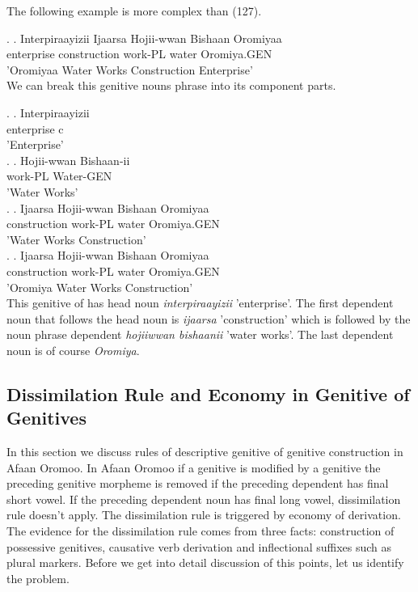 \documentclass[11pt,a4paper]{article}
\begin{document}
	The following example is more complex than (127).
	
	 \ex.
	 \ag.
	 Interpiraayizii Ijaarsa Hojii-wwan Bishaan Oromiyaa\\
	 enterprise construction work-PL water Oromiya.GEN\\
	 'Oromiyaa Water Works Construction Enterprise'\\
	
	
	We can break this genitive nouns phrase into its component parts.
	
	\ex.
	\ag.
	Interpiraayizii\\
	enterprise c\\
	'Enterprise'\\
	
	\ex.
	\ag.
	Hojii-wwan Bishaan-ii\\
	work-PL Water-GEN\\
	'Water Works'\\
	
	\ex.
	\ag.
	Ijaarsa Hojii-wwan Bishaan Oromiyaa\\
	construction work-PL water Oromiya.GEN\\
	'Water Works Construction'\\
	
	\ex.
	\ag.
	Ijaarsa Hojii-wwan Bishaan Oromiyaa\\
	construction work-PL water Oromiya.GEN\\
	'Oromiya Water Works Construction'\\

	This genitive of has head noun \emph{interpiraayizii} 'enterprise'. The first dependent noun that follows the head noun is \emph{ijaarsa} 'construction' which is followed by the noun phrase dependent \emph{hojiiwwan bishaanii} 'water works'. The last dependent noun is of course \emph{Oromiya}. 
	
	\subsection{Dissimilation Rule and Economy in Genitive of Genitives}
	
	In this section we discuss rules of descriptive genitive of genitive construction in Afaan Oromoo. In Afaan Oromoo if a genitive is modified by a genitive the preceding genitive morpheme is removed if the preceding dependent has final short vowel. If the preceding dependent noun has final long vowel, dissimilation rule doesn't apply. The dissimilation rule is triggered by economy of derivation. The evidence for the dissimilation rule comes from three facts: construction of possessive genitives, causative verb derivation and inflectional suffixes such as plural markers. Before we get into detail discussion of this points, let us identify the problem. 
	
\end{document}
